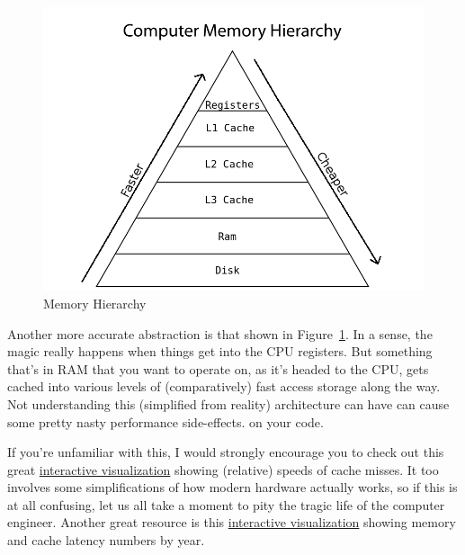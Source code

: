\begin{figure}[ht]
  \centering
  \includegraphics[scale=.54]{./include/pics/memory}
  \caption{Memory Hierarchy}
  \label{fig:mem}
\end{figure}
Another more accurate abstraction is that shown in Figure~\ref{fig:mem}.  In a 
sense, the magic really happens when things get into the CPU registers.  But 
something that's in RAM that you want to operate on, as it's headed to the CPU, 
gets cached into various levels of (comparatively) fast access storage along 
the way. Not understanding this (simplified from reality) architecture can have 
can cause some pretty nasty performance side-effects. on your code.

If you're unfamiliar with this, I would strongly encourage you to check out 
this great
\href{http://www.overbyte.com.au/misc/Lesson3/CacheFun.html}%
{interactive visualization} 
showing (relative) speeds of cache misses. It too involves some simplifications 
of how modern hardware actually works, so if this is at all confusing, let us 
all take a moment to pity the tragic life of the computer engineer.  Another 
great resource is this
\href{http://www.eecs.berkeley.edu/~rcs/research/interactive_latency.html}%
{interactive visualization} showing memory and cache latency numbers by year.





